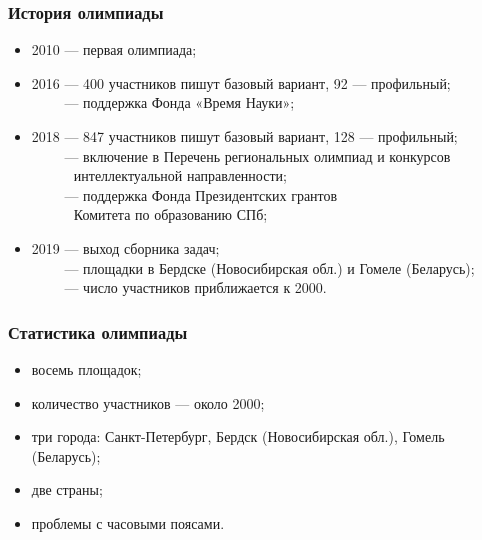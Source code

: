 \begin{frame}\frametitle{История олимпиады}
\begin{itemize}
	\item 2010 — первая олимпиада;
	\item 2016 — 400 участников пишут базовый вариант, 92 --- профильный;\\
        $\phantom{2016}$ — поддержка Фонда «Время Науки»;
	\item 2018 — 847 участников пишут базовый вариант, 128 --- профильный;\\
        $\phantom{2018}$ — включение в Перечень региональных олимпиад и конкурсов\\
	$\phantom{2018 — }$\quad интеллектуальной направленности;\\
	$\phantom{2018}$ — поддержка Фонда Президентских грантов\\
	$\phantom{2018 — }$\quad Комитета по образованию СПб;\\
	\item 2019 — выход сборника задач;\\
        $\phantom{2019}$ — площадки в Бердске (Новосибирская обл.) и Гомеле (Беларусь);\\
        $\phantom{2019}$ — число участников приближается к 2000.
\end{itemize}\end{frame}

\begin{frame}\frametitle{Статистика олимпиады}
\begin{itemize}
        \item восемь площадок;\\
	\item количество участников --- около 2000;\\
	\item три города: Санкт-Петербург, Бердск (Новосибирская обл.), Гомель (Беларусь);\\
        \item две страны;\\
        \item проблемы с часовыми поясами.
\end{itemize}\end{frame}
